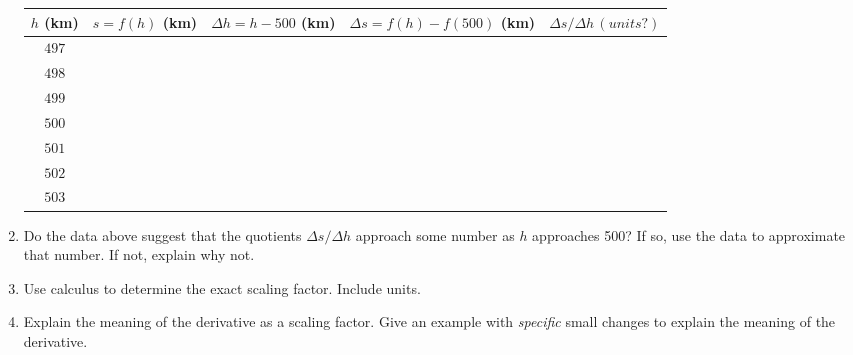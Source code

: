 \documentclass{ximera}
\begin{document}
\begin{question}
\begin{enumerate}
\begin{center}
  \begin{tabular}{ | c| c | c | c | c |}
    \hline
    $h$ (km) & $s = f(h)$ (km) & $\Delta h = h-500$ (km)  & $\Delta s =f(h) - f(500)$ (km) & $\Delta s/\Delta h \, (units?)$ \\ \hline
     $497$ &  &  &   & \\ \hline
    $498$ &  &  &   & \\ \hline
    $499$ &  &  &   &  \\ \hline
    $500$  &  &  &  &   \\ \hline
    $501$ &  &  &   &  \\ \hline
    $502$ &  &  &   &  \\ \hline
    $503$ &  &  &   &  \\ \hline
    \hline
  \end{tabular}
\end{center}

\item Do the data above suggest that the quotients $\Delta s / \Delta h$ approach some number as $h$ approaches 500? If so, use the data to approximate that number. If not, explain why not.


\item Use calculus to determine the exact scaling factor. Include units.

\item Explain the meaning of the derivative as a scaling factor. Give an example with \emph{specific} small changes to explain the meaning of the derivative. 

\end{enumerate}

\end{question}
\end{document}
